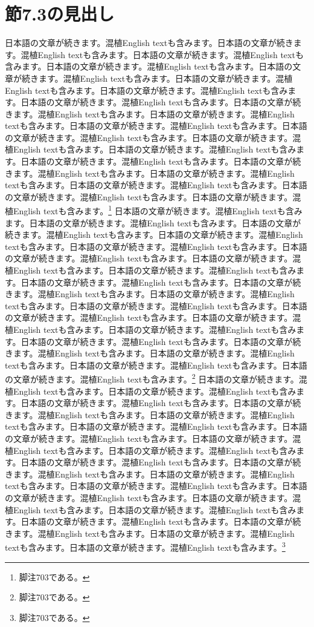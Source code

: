 \documentclass[pdflatex,book]{jlreq}
\begin{document}
\section{節7.3の見出し}
日本語の文章が続きます。混植English textも含みます。日本語の文章が続きます。混植English textも含みます。日本語の文章が続きます。混植English textも含みます。日本語の文章が続きます。混植English textも含みます。日本語の文章が続きます。混植English textも含みます。日本語の文章が続きます。混植English textも含みます。日本語の文章が続きます。混植English textも含みます。日本語の文章が続きます。混植English textも含みます。日本語の文章が続きます。混植English textも含みます。日本語の文章が続きます。混植English textも含みます。日本語の文章が続きます。混植English textも含みます。日本語の文章が続きます。混植English textも含みます。日本語の文章が続きます。混植English textも含みます。日本語の文章が続きます。混植English textも含みます。日本語の文章が続きます。混植English textも含みます。日本語の文章が続きます。混植English textも含みます。日本語の文章が続きます。混植English textも含みます。日本語の文章が続きます。混植English textも含みます。日本語の文章が続きます。混植English textも含みます。日本語の文章が続きます。混植English textも含みます。\footnote{脚注703である。}
日本語の文章が続きます。混植English textも含みます。日本語の文章が続きます。混植English textも含みます。日本語の文章が続きます。混植English textも含みます。日本語の文章が続きます。混植English textも含みます。日本語の文章が続きます。混植English textも含みます。日本語の文章が続きます。混植English textも含みます。日本語の文章が続きます。混植English textも含みます。日本語の文章が続きます。混植English textも含みます。日本語の文章が続きます。混植English textも含みます。日本語の文章が続きます。混植English textも含みます。日本語の文章が続きます。混植English textも含みます。日本語の文章が続きます。混植English textも含みます。日本語の文章が続きます。混植English textも含みます。日本語の文章が続きます。混植English textも含みます。日本語の文章が続きます。混植English textも含みます。日本語の文章が続きます。混植English textも含みます。日本語の文章が続きます。混植English textも含みます。日本語の文章が続きます。混植English textも含みます。日本語の文章が続きます。混植English textも含みます。日本語の文章が続きます。混植English textも含みます。\footnote{脚注703である。}
日本語の文章が続きます。混植English textも含みます。日本語の文章が続きます。混植English textも含みます。日本語の文章が続きます。混植English textも含みます。日本語の文章が続きます。混植English textも含みます。日本語の文章が続きます。混植English textも含みます。日本語の文章が続きます。混植English textも含みます。日本語の文章が続きます。混植English textも含みます。日本語の文章が続きます。混植English textも含みます。日本語の文章が続きます。混植English textも含みます。日本語の文章が続きます。混植English textも含みます。日本語の文章が続きます。混植English textも含みます。日本語の文章が続きます。混植English textも含みます。日本語の文章が続きます。混植English textも含みます。日本語の文章が続きます。混植English textも含みます。日本語の文章が続きます。混植English textも含みます。日本語の文章が続きます。混植English textも含みます。日本語の文章が続きます。混植English textも含みます。日本語の文章が続きます。混植English textも含みます。日本語の文章が続きます。混植English textも含みます。日本語の文章が続きます。混植English textも含みます。\footnote{脚注703である。}
\end{document}
